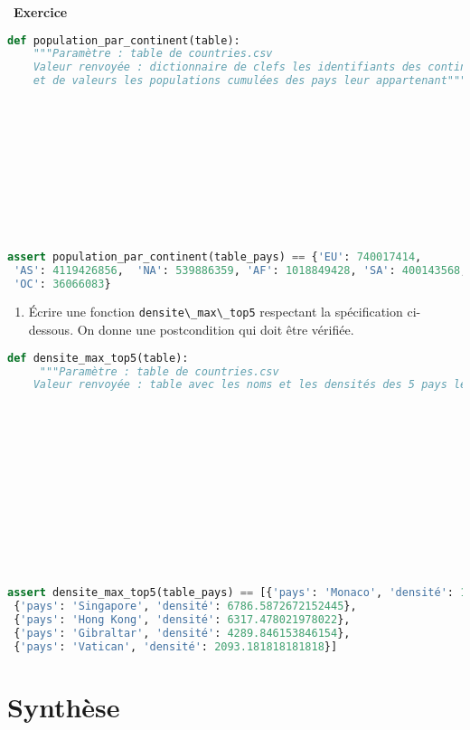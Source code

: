 \documentclass[
  11pt,
]{article}
\newcommand{\passthrough}[1]{#1}
\providecommand{\tightlist}{%
  \setlength{\itemsep}{0pt}\setlength{\parskip}{0pt}}
\newcounter{exo}
\newenvironment{exercice}[1]
{\par \medskip   \addtocounter{exo}{1} \noindent  
\begin{bclogo}[arrondi =0.1,   noborder = true, logo=\bccrayon, marge=4]{~\textbf{Exercice} \textbf{\theexo} {\itshape #1} }  \par}
{
\end{bclogo}
 \par \bigskip }
\newcounter{def}
\begin{document}
\begin{exercice}{}
\begin{lstlisting}[language=Python]
def population_par_continent(table):
    """Paramètre : table de countries.csv
    Valeur renvoyée : dictionnaire de clefs les identifiants des continents
    et de valeurs les populations cumulées des pays leur appartenant"""
    








        

assert population_par_continent(table_pays) == {'EU': 740017414,
 'AS': 4119426856,  'NA': 539886359, 'AF': 1018849428, 'SA': 400143568, 
 'OC': 36066083}
\end{lstlisting}

\begin{enumerate}
\def\labelenumi{\arabic{enumi}.}
\setcounter{enumi}{8}
\tightlist
\item
  Écrire une fonction \passthrough{\lstinline!densite\_max\_top5!}
  respectant la spécification ci-dessous. On donne une postcondition qui
  doit être vérifiée.
\end{enumerate}

\begin{lstlisting}[language=Python]
def densite_max_top5(table):
     """Paramètre : table de countries.csv
    Valeur renvoyée : table avec les noms et les densités des 5 pays les plus  densément peuplées dans l'ordre décroissant des densités de population"""
    












assert densite_max_top5(table_pays) == [{'pays': 'Monaco', 'densité': 16905.128205128207},
 {'pays': 'Singapore', 'densité': 6786.5872672152445},
 {'pays': 'Hong Kong', 'densité': 6317.478021978022},
 {'pays': 'Gibraltar', 'densité': 4289.846153846154},
 {'pays': 'Vatican', 'densité': 2093.181818181818}]
\end{lstlisting}

\end{exercice}

\hypertarget{synthuxe8se}{%
\section{Synthèse}\label{synthuxe8se}}
\end{document}
